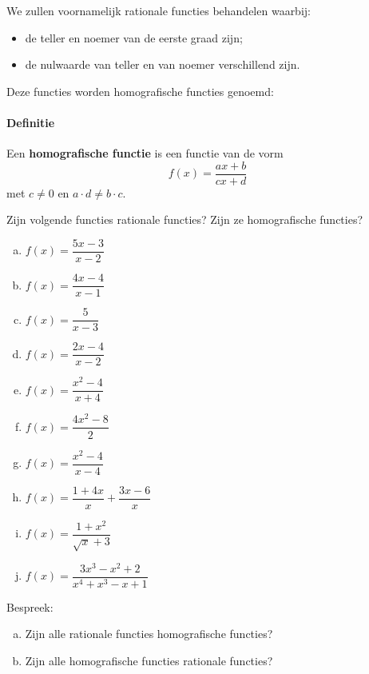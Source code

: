 \documentclass[12pt]{article}
\begin{document}
We zullen voornamelijk rationale functies behandelen waarbij:
\begin{itemize}
  \item de teller en noemer van de eerste graad zijn;
  \item de nulwaarde van teller en van noemer verschillend zijn.
\end{itemize}
Deze functies worden homografische functies genoemd:

\paragraph*{Definitie}
\begin{mdframed}
Een {\bf homografische functie} is een functie van de vorm
$$f(x)=\dfrac{ax+b}{cx+d}$$
met $c\neq 0$ en $a\cdot d\neq b\cdot c$.
\end{mdframed}

\begin{oefening}
Zijn volgende functies rationale functies? Zijn ze homografische functies?
\begin{multicols}{2}
\begin{enumerate}[(a)]
  \itemsep1em
  \item $f(x)=\dfrac{5x-3}{x-2}$
  \item $f(x)=\dfrac{4x-4}{x-1}$
  \item $f(x)=\dfrac{5}{x-3}$
  \item $f(x)=\dfrac{2x-4}{x-2}$
  \item $f(x)=\dfrac{x^2-4}{x+4}$
  \item $f(x)=\dfrac{4x^2-8}{2}$
  \item $f(x)=\dfrac{x^2-4}{x-4}$
  \item $f(x)=\dfrac{1+4x}{x}+\dfrac{3x-6}{x}$
  \item $f(x)=\dfrac{1+x^2}{\sqrt{x}+3}$
  \item $f(x)=\dfrac{3x^3-x^2+2}{x^4+x^3-x+1}$
\end{enumerate}
\end{multicols}
\end{oefening}

\begin{oefening}
Bespreek:
\begin{enumerate}[(a)]
  \item Zijn alle rationale functies homografische functies?
  \item Zijn alle homografische functies rationale functies?
\end{enumerate}
\end{oefening}
\end{document}

